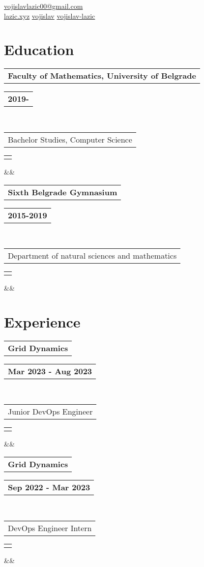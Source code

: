 \documentclass[11pt,a4paper,roman]{moderncv}        %
\makeatletter
\newcommand*{\customcventry}[7][.25em]{
  \begin{tabular}{@{}l}
    {\bfseries #4}
  \end{tabular}
  \hfill%
  \begin{tabular}{l@{}}
     {\bfseries #5}
  \end{tabular} \\
  \begin{tabular}{@{}l}
    {#3}
  \end{tabular}
  \hfill%
  \begin{tabular}{l@{}}
     {\itshape #2}
  \end{tabular}
  \ifx&#7&%
  \else{\\%
    \begin{minipage}{\maincolumnwidth}%
      \small#7%
    \end{minipage}}\fi%
  \par\addvspace{#1}}
\makeatother
\begin{document}
\makecvtitle
\vspace*{-17mm}

\begin{center}
	\faEnvelopeO\enspace \href{mail:vojislavlazic00@gmail.com}{vojislavlazic00@gmail.com} \\
	\faGlobe\enspace \href{https://lazic.xyz}{lazic.xyz} \enspace
	\faGithub\enspace \href{https://github.com/vojislav}{vojislav} \enspace
	\faLinkedinSquare\enspace \href{https://www.linkedin.com/in/vojislav-lazic/}{vojislav-lazic}
\end{center}

\section{Education}
{\customcventry{}{Bachelor Studies, Computer Science}{Faculty of Mathematics, University of Belgrade}{2019-}{}{}}
{\customcventry{}{Department of natural sciences and mathematics}{Sixth Belgrade Gymnasium}{2015-2019}{}{}}


\section{Experience}
{\customcventry{}{Junior DevOps Engineer}{Grid Dynamics}{Mar 2023 - Aug 2023}{}{}}
{\customcventry{}{DevOps Engineer Intern}{Grid Dynamics}{Sep 2022 - Mar 2023}{}{}}
\end{document}
